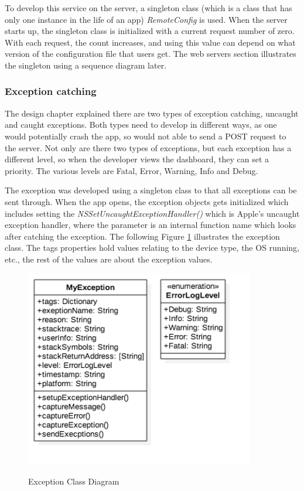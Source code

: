 To develop this service on the server, a singleton class (which is a class that has only one instance in the life of an app) \textit{RemoteConfig} is used. When the server starts up, the singleton class is initialized with a current request number of zero. With each request, the count increases, and using this value can depend on what version of the configuration file that users get. The web servers section illustrates the singleton using a sequence diagram later.


\subsubsection{Exception catching} \label{dev:sub_exception}

The design chapter explained there are two types of exception catching, uncaught and caught exceptions. Both types need to develop in different ways, as one would potentially crash the app, so would not able to send a POST request to the server. Not only are there two types of exceptions, but each exception has a different level, so when the developer views the dashboard, they can set a priority. The various levels are Fatal, Error, Warning, Info and Debug.

The exception was developed using a singleton class to that all exceptions can be sent through. When the app opens, the exception objects gets initialized which includes setting the \textit{NSSetUncaughtExceptionHandler()} which is Apple’s uncaught exception handler, where the parameter is an internal function name which looks after catching the exception. The following Figure \ref{fig:exception-cd} illustrates the exception class. The tags properties hold values relating to the device type, the OS running, etc., the rest of the values are about the exception values.

\begin{figure}[!h]
    \caption{Exception Class Diagram}
    \centering
    \includegraphics[width=100mm]{images/classdiagrams/Exception}
    \label{fig:exception-cd}
\end{figure}

